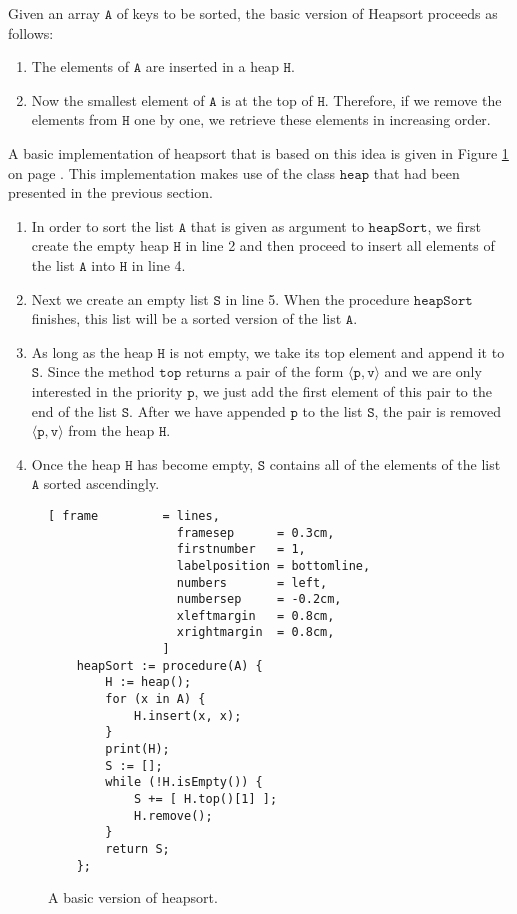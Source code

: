 Given an array $\mathtt{A}$ of keys to be sorted, the basic version of Heapsort proceeds as follows:
\begin{enumerate}
\item The elements of $\mathtt{A}$ are inserted in a heap $\mathtt{H}$.
\item Now the smallest element of $\mathtt{A}$ is at the top of $\mathtt{H}$.  Therefore, if we remove the elements
      from $\mathtt{H}$ one by one, we retrieve these elements in increasing order.
\end{enumerate}
A basic implementation of heapsort that is based on this idea is given in Figure
\ref{fig:basic-heapsort.stlx} on page \pageref{fig:basic-heapsort.stlx}.  This implementation makes
use of the class $\mathtt{heap}$ that had been presented in the previous section.
\begin{enumerate}
\item In order to sort the list $\mathtt{A}$ that is given as argument to $\mathtt{heapSort}$, we first
      create the empty heap 
      $\mathtt{H}$ in line 2 and then proceed to insert all elements of the list $\mathtt{A}$ into $\mathtt{H}$ 
      in line 4.
\item Next we create an empty list $\mathtt{S}$ in line 5. When the procedure $\mathtt{heapSort}$
      finishes, this list will be a sorted version of the list $\mathtt{A}$.
\item As long as the heap $\mathtt{H}$ is not empty, we take its top element and append it to
      $\mathtt{S}$.  Since the method $\mathtt{top}$ returns a pair of the form $\langle \mathtt{p}, \mathtt{v}\rangle$ and
      we are only interested in the priority $\mathtt{p}$, we just add the first element of this pair to the
      end of the list $\mathtt{S}$.  After we have appended $\mathtt{p}$ to the list $\mathtt{S}$, the pair
      is removed $\langle \mathtt{p}, \mathtt{v}\rangle$ from the heap $\mathtt{H}$.
\item Once the heap $\mathtt{H}$ has become empty, $\mathtt{S}$ contains all of the elements of the list $\mathtt{A}$
      sorted ascendingly.
\end{enumerate}

\begin{figure}[!ht]
\centering
\begin{Verbatim}[ frame         = lines, 
                  framesep      = 0.3cm, 
                  firstnumber   = 1,
                  labelposition = bottomline,
                  numbers       = left,
                  numbersep     = -0.2cm,
                  xleftmargin   = 0.8cm,
                  xrightmargin  = 0.8cm,
                ]
    heapSort := procedure(A) {
        H := heap();    
        for (x in A) {
            H.insert(x, x);
        }
        print(H);
        S := [];
        while (!H.isEmpty()) {
            S += [ H.top()[1] ];
            H.remove();
        }
        return S;
    };
\end{Verbatim}
\vspace*{-0.3cm}
\caption{A basic version of heapsort.}
\label{fig:basic-heapsort.stlx}
\end{figure}

